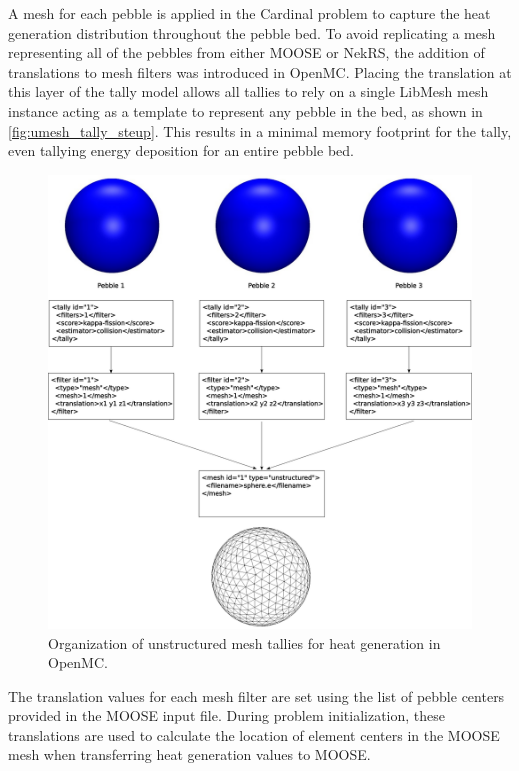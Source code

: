 A mesh for each pebble is applied in the Cardinal problem to capture the heat generation distribution throughout the pebble bed. To avoid replicating a mesh representing all of the pebbles from either MOOSE or NekRS, the addition of translations to mesh filters was introduced in OpenMC. Placing the translation at this layer of the tally model allows all tallies to rely on a single LibMesh mesh instance acting as a template to represent any pebble in the bed, as shown in \autoref{fig:umesh_tally_steup}. This results in a minimal memory footprint for the tally, even tallying energy deposition for an entire pebble bed.

\begin{figure}[ht]
    \centering
    \includegraphics[width=\textwidth]{Figures/umesh_tally_diagram}
    \caption{Organization of unstructured mesh tallies for heat generation in OpenMC.}
    \label{fig:umesh_tally_steup}
\end{figure}

The translation values for each mesh filter are set using the list of pebble centers provided in the MOOSE input file. During problem initialization, these translations are used to calculate the location of element centers in the MOOSE mesh when transferring heat generation values to MOOSE.

